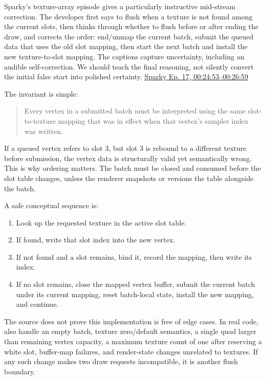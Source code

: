 Sparky's texture-array episode gives a particularly instructive mid-stream correction. The developer first says to flush when a texture is not found among the current slots, then thinks through whether to flush before or after ending the draw, and corrects the order: end/unmap the current batch, submit the queued data that uses the old slot mapping, then start the next batch and install the new texture-to-slot mapping. The captions capture uncertainty, including an audible self-correction. We should teach the final reasoning, not silently convert the initial false start into polished certainty. \href{https://www.youtube.com/watch?v=1x4hrdS97cI&t=24m53s}{Sparky Ep. 17, 00:24:53--00:26:59}

The invariant is simple:

\begin{quote}
Every vertex in a submitted batch must be interpreted using the same slot-to-texture mapping that was in effect when that vertex's sampler index was written.
\end{quote}

If a queued vertex refers to slot 3, but slot 3 is rebound to a different texture before submission, the vertex data is structurally valid yet semantically wrong. This is why ordering matters. The batch must be closed and consumed before the slot table changes, unless the renderer snapshots or versions the table alongside the batch.

A safe conceptual sequence is:

\begin{enumerate}
\def\labelenumi{\arabic{enumi}.}
\tightlist
\item
  Look up the requested texture in the active slot table.
\item
  If found, write that slot index into the new vertex.
\item
  If not found and a slot remains, bind it, record the mapping, then write its index.
\item
  If no slot remains, close the mapped vertex buffer, submit the current batch under its current mapping, reset batch-local state, install the new mapping, and continue.
\end{enumerate}

The source does not prove this implementation is free of edge cases. In real code, also handle an empty batch, texture zero/default semantics, a single quad larger than remaining vertex capacity, a maximum texture count of one after reserving a white slot, buffer-map failures, and render-state changes unrelated to textures. If any such change makes two draw requests incompatible, it is another flush boundary.

